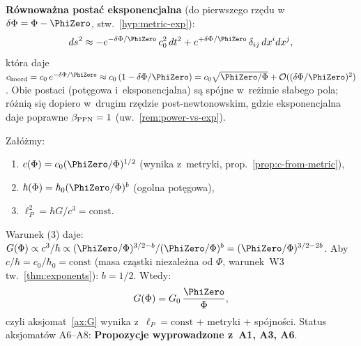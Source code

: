 \begin{proposition}
\medskip\noindent
\textbf{R\'ownowa\.zna posta\'c eksponencjalna} (do pierwszego rz\k{e}du
w~$\delta\Phi = \Phi - \PhiZero$, stw.~\ref{hyp:metric-exp}):
\begin{equation}
  ds^2 \approx -e^{-\delta\Phi/\PhiZero}\,c_0^2\,dt^2
         + e^{+\delta\Phi/\PhiZero}\,\delta_{ij}\,dx^i dx^j,
\end{equation}
kt\'ora daje $c_{\rm koord} = c_0\,e^{-\delta\Phi/\PhiZero}
\approx c_0\,(1 - \delta\Phi/\PhiZero) = c_0\sqrt{\PhiZero/\Phi}
+ \mathcal{O}((\delta\Phi/\PhiZero)^2)$.
Obie postaci (pot\k{e}gowa i~eksponencjalna) s\k{a} sp\'ojne
w~re\.zimie s\l{}abego pola; r\'o\.zni\k{a} si\k{e} dopiero
w~drugim rz\k{e}dzie post-newtonowskim, gdzie eksponencjalna
daje poprawne $\beta_{\rm PPN} = 1$
(uw.~\ref{rem:power-vs-exp}).
\end{proposition}

\begin{proposition}\label{prop:G-from-lP}
Za\l{}\'o\.zmy:
\begin{enumerate}[nosep]
  \item $c(\Phi) = c_0(\PhiZero/\Phi)^{1/2}$ (wynika z~metryki, prop.~\ref{prop:c-from-metric}),
  \item $\hbar(\Phi) = \hbar_0(\PhiZero/\Phi)^{b}$ (ogolna pot\k{e}gowa),
  \item $\ell_P^2 = \hbar G/c^3 = \mathrm{const}$.
\end{enumerate}
Warunek (3) daje: $G(\Phi) \propto c^3/\hbar \propto (\PhiZero/\Phi)^{3/2 - b}/(\PhiZero/\Phi)^b
= (\PhiZero/\Phi)^{3/2 - 2b}$.
Aby $c/\hbar = c_0/\hbar_0 = \mathrm{const}$ (masa cz\k{a}stki niezale\.zna od $\Phi$,
warunek~W3 tw.~\ref{thm:exponents}): $b = 1/2$. Wtedy:
\begin{equation}
  G(\Phi) = G_0\,\frac{\PhiZero}{\Phi},
\end{equation}
czyli aksjomat~\ref{ax:G} wynika z~$\ell_P = \mathrm{const}$ + metryki + sp\'ojno\'sci.
Status aksjomat\'ow A6--A8: \textbf{Propozycje wyprowadzone z~A1, A3, A6}.
\end{proposition}


